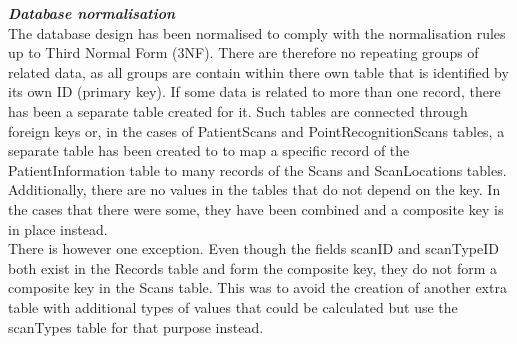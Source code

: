 \emph{\bf{Database normalisation}}\\

The database design has been normalised to comply with the normalisation rules up to Third Normal Form (3NF). There are therefore no repeating groups of related data, as all groups are contain within there own table that is identified by its own ID (primary key). If some data is related to more than one record, there has been a separate table created for it. Such tables are connected through foreign keys or, in the cases of PatientScans and PointRecognitionScans tables, a separate table has been created to to map a specific record of the PatientInformation table to many records of the Scans and ScanLocations tables. Additionally, there are no values in the tables that do not depend on the key. In the cases that there were some, they have been combined and a composite key is in place instead.\\

There is however one exception. Even though the fields scanID and scanTypeID both exist in the Records table and form the composite key, they do not form a composite key in the Scans table. This was to avoid the creation of another extra table with additional types of values that could be calculated but use the scanTypes table for that purpose instead.\\